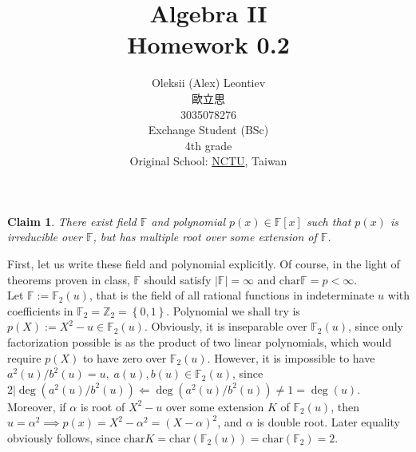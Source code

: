 \documentclass[8pt]{article} %
\title{Algebra II\\Homework 0.2}
\author{Oleksii (Alex) Leontiev\\歐立思\\3035078276\\Exchange Student (BSc)\\4th grade\\
Original School: \href{http://www.nctu.edu.tw/}{NCTU}, Taiwan}
\newtheorem{claim}{Claim}
\newenvironment{proof}[1][Proof]{\begin{trivlist}
\item[\hskip \labelsep {\bfseries #1}]}{\qed\end{trivlist}}
\newcommand{\qed}{\nobreak \ifvmode \relax \else
\ifdim\lastskip<1.5em \hskip-\lastskip
\hskip1.5em plus0em minus0.5em \fi \nobreak
  \vrule height0.75em width0.5em depth0.25em\fi}
\newcommand{\F}{\mathbb{F}_2(u)}
\newcommand{\charac}{\text{char}}
\begin{document}
\begin{CJK}{UTF8}{bsmi}
\maketitle
\end{CJK}
\begin{claim}
	There exist field $\mathbb{F}$ and polynomial $p(x)\in\mathbb{F}[x]$ such that $p(x)$ is irreducible over $\mathbb{F}$, but has multiple root over some extension of $\mathbb{F}$.
\end{claim}
\begin{proof}First, let us write these field and polynomial explicitly. Of course, in the light of theorems proven in class, $\mathbb{F}$ should satisfy $|\mathbb{F}|=\infty$ and $\text{char}\mathbb{F}=p<\infty$.\\
	Let $\mathbb{F}:=\mathbb{F}_2(u)$, that is the field of all rational functions in indeterminate $u$ with coefficients in $\mathbb{F}_2=\mathbb{Z}_2=\left\{0,1\right\}$. Polynomial we shall try is $p(X):=X^2-u\in\mathbb{F}_2(u)$.
	Obviously, it is inseparable over $\mathbb{F}_2(u)$, since only factorization possible is as the product of two linear polynomials, which would require $p(X)$ to have zero over $\F$. However, it is impossible
	to have $a^2(u)/b^2(u)=u,\;a(u),b(u)\in\F$, since $2|\deg (a^2(u)/b^2(u))\Leftarrow\deg (a^2(u)/b^2(u))\neq 1=\deg(u)$. Moreover, if $\alpha$ is root of $X^2-u$ over some extension $K$ of $\F$, then
	$u=\alpha^2\implies p(x)=X^2-\alpha^2={(X-\alpha)}^2$, and $\alpha$ is double root. Later equality obviously follows, since $\charac K=\charac (\F)=\charac (\mathbb{F}_2)=2$.

\end{proof}
\end{document}
